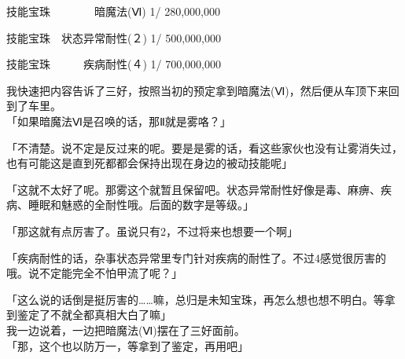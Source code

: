   技能宝珠　　　　暗魔法(Ⅵ) 1/ 280,000,000

  技能宝珠　状态异常耐性(２) 1/ 500,000,000

  技能宝珠　　　疾病耐性(４) 1/ 700,000,000

\cardline

我快速把内容告诉了三好，按照当初的预定拿到暗魔法(Ⅵ)，然后便从车顶下来回到了车里。\\

「如果暗魔法Ⅵ是召唤的话，那Ⅱ就是雾咯？」

「不清楚。说不定是反过来的呢。要是是雾的话，看这些家伙也没有让雾消失过，也有可能这是直到死都都会保持出现在身边的被动技能呢」

「这就不太好了呢。那雾这个就暂且保留吧。状态异常耐性好像是毒、麻痹、疾病、睡眠和魅惑的全耐性哦。后面的数字是等级。」

「那这就有点厉害了。虽说只有2，不过将来也想要一个啊」

「疾病耐性的话，杂事状态异常里专门针对疾病的耐性了。不过4感觉很厉害的哦。说不定能完全不怕甲流了呢？」

「这么说的话倒是挺厉害的……嘛，总归是未知宝珠，再怎么想也想不明白。等拿到鉴定了不就全都真相大白了嘛」\\

我一边说着，一边把暗魔法(Ⅵ)摆在了三好面前。\\

「那，这个也以防万一，等拿到了鉴定，再用吧」

